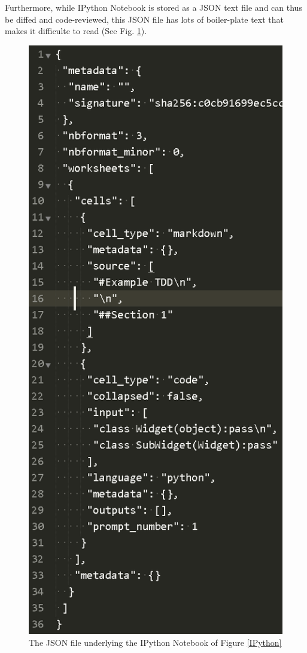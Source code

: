 \documentclass[]{article}
\begin{document}
		Furthermore, while IPython Notebook is stored as a JSON text file and can thus be diffed and code-reviewed, 
		this JSON file has lots of boiler-plate text that makes it difficulte to read (See Fig. \ref{IPython_JSON}).
		
		\begin{figure}[h]
			\centering
			\includegraphics[scale=.5]{IPython_Notebook_code.PNG}
			\caption{The JSON file underlying the IPython Notebook of Figure \ref{IPython}}
			\label{IPython_JSON}
		\end{figure}
		
\end{document}
